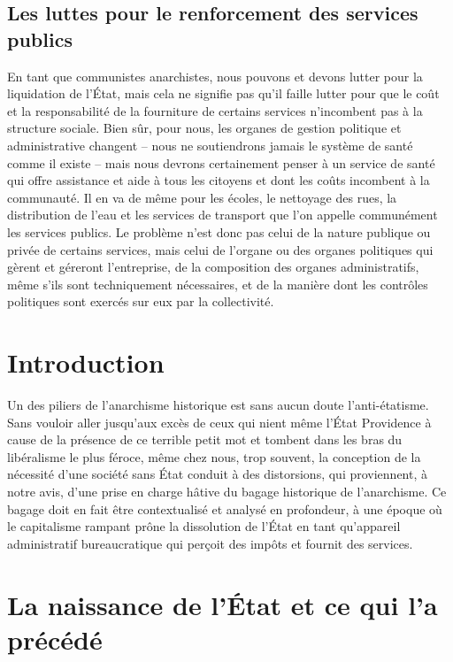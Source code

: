\section*{Les luttes pour le renforcement des services publics}

En tant que communistes anarchistes, nous pouvons et devons lutter pour la liquidation de l'État, mais cela ne signifie pas qu'il faille lutter pour que le coût et la responsabilité de la fourniture de certains services n'incombent pas à la structure sociale. Bien sûr, pour nous, les organes de gestion politique et administrative changent – nous ne soutiendrons jamais le système de santé comme il existe – mais nous devrons certainement penser à un service de santé qui offre assistance et aide à tous les citoyens et dont les coûts incombent à la communauté. Il en va de même pour les écoles, le nettoyage des rues, la distribution de l'eau et les services de transport que l'on appelle communément les services publics. Le problème n'est donc pas celui de la nature publique ou privée de certains services, mais celui de l'organe ou des organes politiques qui gèrent et géreront l'entreprise, de la composition des organes administratifs, même s'ils sont techniquement nécessaires, et de la manière dont les contrôles politiques sont exercés sur eux par la collectivité.

\chapter*{Introduction}

Un des piliers de l'anarchisme historique est sans aucun doute l'anti-étatisme. Sans vouloir aller jusqu'aux excès de ceux qui nient même l'État Providence à cause de la présence de ce terrible petit mot et tombent dans les bras du libéralisme le plus féroce, même chez nous, trop souvent, la conception de la nécessité d'une société sans État conduit à des distorsions, qui proviennent, à notre avis, d'une prise en charge hâtive du bagage historique de l'anarchisme. Ce bagage doit en fait être contextualisé et analysé en profondeur, à une époque où le capitalisme rampant prône la dissolution de l'État en tant qu'appareil administratif bureaucratique qui perçoit des impôts et fournit des services.

\chapter{La naissance de l'État et ce qui l'a précédé}

